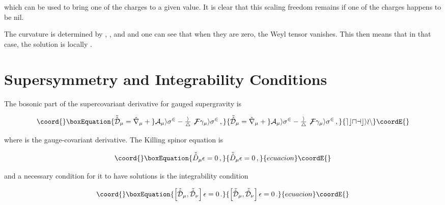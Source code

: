 \documentclass[12pt,a4paper]{article}
\begin{document}
\noindent which can be used to bring one of the charges to a given value. 
It is clear that this scaling freedom remains if one of the charges
happens to be nil.

The curvature is determined by \coordHE{}, \coordHE{},
\coordHE{} and \coordHE{} and one can see that when they are zero,
the Weyl tensor vanishes.  This then means that in that case, the
solution is locally \coordHE{}.


\section{Supersymmetry and Integrability Conditions}
\label{sec-susy-KN-TN}

The bosonic part of the supercovariant derivative for gauged \coordHE{}
supergravity is

\begin{equation}\coord{}\boxEquation{
\tilde{\hat{\cal D}}_{\mu}=
\hat{\nabla}_{\mu}  +gA_{\mu}i\sigma^{2}
-{\textstyle\frac{i}{4}}\not\!F\gamma_{\mu}i\sigma^{2}\, ,
}{
\tilde{\hat{\cal D}}_{\mu}=
\hat{\nabla}_{\mu}  +gA_{\mu}i\sigma^{2}
-{\textstyle\frac{i}{4}}\not\!F\gamma_{\mu}i\sigma^{2}\, ,
}{ecuacion}\coordE{}\end{equation}

\noindent where \myHighlight{$\hat{\nabla}_{\mu}$}\coordHE{} is the \coordHE{} 
gauge-covariant derivative.  The Killing spinor equation is

\begin{equation}\coord{}\boxEquation{
\tilde{\hat{D}}_{\mu}\epsilon=0\, ,
}{
\tilde{\hat{D}}_{\mu}\epsilon=0\, ,
}{ecuacion}\coordE{}\end{equation}

\noindent and a necessary condition for it to have solutions is the
integrability condition

\begin{equation}\coord{}\boxEquation{
\left[\tilde{\hat{\cal D}}_{\mu},\tilde{\hat{\cal D}}_{\nu}\right]  
\epsilon=0\, .
}{
\left[\tilde{\hat{\cal D}}_{\mu},\tilde{\hat{\cal D}}_{\nu}\right]  
\epsilon=0\, .
}{ecuacion}\coordE{}\end{equation}
\end{document}
